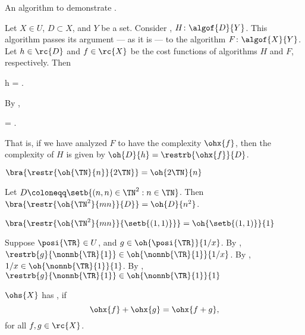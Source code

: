 \documentclass[b5paper, english, oneside]{memoir}
\begin{document}
\begin{algorithm}
\caption{An algorithm to demonstrate .}
\label{alg:restriction}
\begin{algorithmic}[1]
\State \Return {}
\EndProcedure
\end{algorithmic}
\end{algorithm}

\begin{example}
Let $X \in U$, $D \subset X$, and $Y$ be a set. Consider , $H \colon \algof{D}{Y}$. This algorithm passes its argument --- as it is --- to the algorithm $F \colon \algof{X}{Y}$. Let $h \in \rc{D}$ and $f \in \rc{X}$ be the cost functions of algorithms $H$ and $F$, respectively. Then
\begin{eqs}
h = .
\end{eqs}
By ,
\begin{eqs}
 = .
\end{eqs}
That is, if we have analyzed $F$ to have the complexity $\ohx{f}$, then the complexity of $H$ is given by $\oh{D}{h} = \restrb{\ohx{f}}{D}$.
\end{example}

\begin{example}
$\bra{\restr{\oh{\TN}{n}}{2\TN}} = \oh{2\TN}{n}$
\end{example}

\begin{example}
Let $D \coloneqq \setb{(n, n) \in \TN^2 : n \in \TN}$. Then $\bra{\restr{\oh{\TN^2}{mn}}{D}} = \oh{D}{n^2}$.
\end{example}

\begin{example}
$\bra{\restr{\oh{\TN^2}{mn}}{\setb{(1, 1)}}} = \oh{\setb{(1, 1)}}{1}$
\end{example}

\begin{example}
Suppose $\posi{\TR} \in U$, and $g \in \oh{\posi{\TR}}{1 / x}$. By , $\restrb{g}{\nonnb{\TR}{1}} \in \oh{\nonnb{\TR}{1}}{1 / x}$. By , $1 / x \in \oh{\nonnb{\TR}{1}}{1}$. By , $\restrb{g}{\nonnb{\TR}{1}} \in \oh{\nonnb{\TR}{1}}{1}$ 
\end{example}

\begin{definition}
$\ohs{X}$ has , if
\begin{equation}
\ohx{f} + \ohx{g} = \ohx{f + g},
\end{equation}
for all $f, g \in \rc{X}$.
\end{definition}
\end{document}
